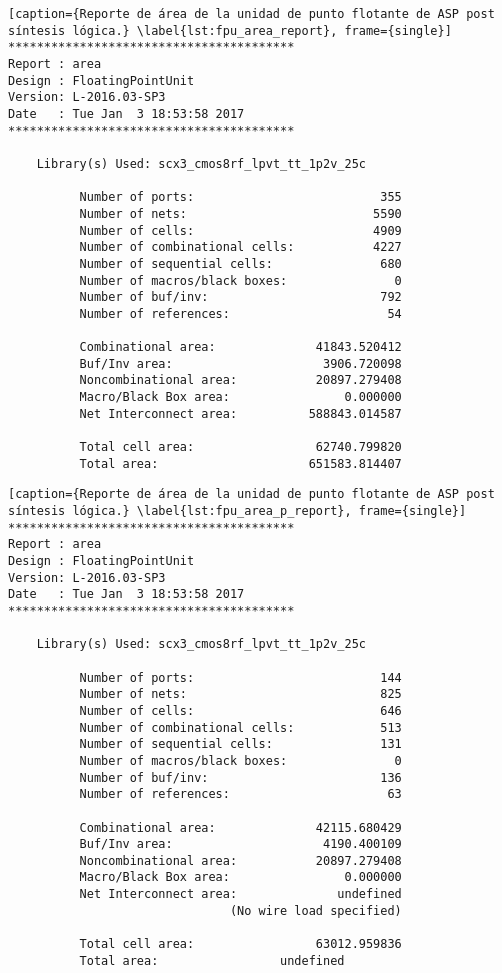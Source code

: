 \begin{lstlisting}[caption={Reporte de área de la unidad de punto flotante de ASP post síntesis lógica.} \label{lst:fpu_area_report}, frame={single}]
****************************************
Report : area
Design : FloatingPointUnit
Version: L-2016.03-SP3
Date   : Tue Jan  3 18:53:58 2017
****************************************

	Library(s) Used: scx3_cmos8rf_lpvt_tt_1p2v_25c

          Number of ports:                          355
          Number of nets:                          5590
          Number of cells:                         4909
          Number of combinational cells:           4227
          Number of sequential cells:               680
          Number of macros/black boxes:               0
          Number of buf/inv:                        792
          Number of references:                      54

          Combinational area:              41843.520412
          Buf/Inv area:                     3906.720098
          Noncombinational area:           20897.279408
          Macro/Black Box area:                0.000000
          Net Interconnect area:          588843.014587

          Total cell area:                 62740.799820
          Total area:                     651583.814407
\end{lstlisting}

\begin{lstlisting}[caption={Reporte de área de la unidad de punto flotante de ASP post síntesis lógica.} \label{lst:fpu_area_p_report}, frame={single}]
****************************************
Report : area
Design : FloatingPointUnit
Version: L-2016.03-SP3
Date   : Tue Jan  3 18:53:58 2017
****************************************

	Library(s) Used: scx3_cmos8rf_lpvt_tt_1p2v_25c

          Number of ports:                          144
          Number of nets:                           825
          Number of cells:                          646
          Number of combinational cells:            513
          Number of sequential cells:               131
          Number of macros/black boxes:               0
          Number of buf/inv:                        136
          Number of references:                      63

          Combinational area:              42115.680429
          Buf/Inv area:                     4190.400109
          Noncombinational area:           20897.279408
          Macro/Black Box area:                0.000000
          Net Interconnect area:              undefined
                               (No wire load specified)

          Total cell area:                 63012.959836
          Total area:                 undefined
\end{lstlisting}


